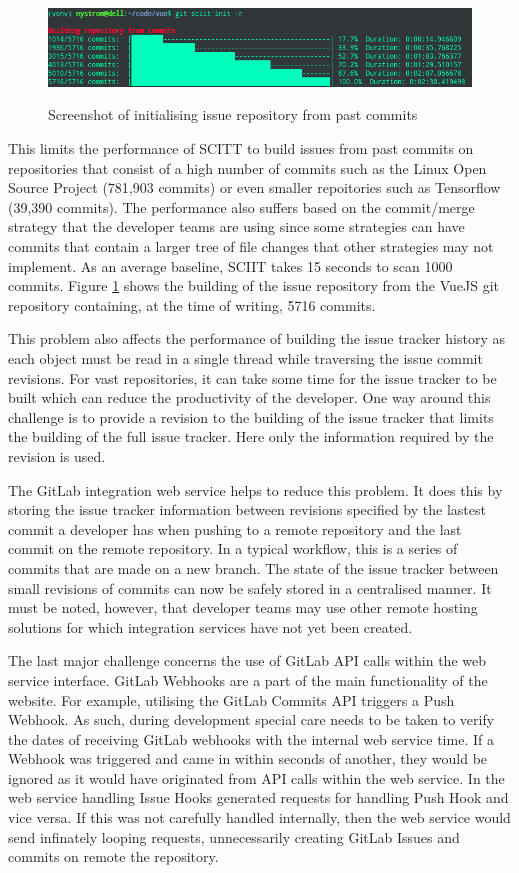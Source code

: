 \documentclass{mproj}
\begin{document}
\begin{figure}[t]
\centering
  \caption{Screenshot of initialising issue repository from past commits}
  \includegraphics[width=14cm]{sciit-init}
  \label{fig:sciit-init}
\end{figure}

This limits the performance of SCITT to build issues from past commits on repositories that consist of a high number of commits such as the Linux Open Source Project (781,903 commits) or even smaller repoitories such as Tensorflow (39,390 commits). The performance also suffers based on the commit/merge strategy that the developer teams are using since some strategies can have commits that contain a larger tree of file changes that other strategies may not implement. As an average baseline, SCIIT takes 15 seconds to scan 1000 commits. Figure \ref{fig:sciit-init} shows the building of the issue repository from the VueJS git repository containing, at the time of writing, 5716 commits.

This problem also affects the performance of building the issue tracker history as each object must be read in a single thread while traversing the issue commit revisions. For vast repositories, it can take some time for the issue tracker to be built which can reduce the productivity of the developer. One way around this challenge is to provide a revision to the building of the issue tracker that limits the building of the full issue tracker. Here only the information required by the revision is used.

The GitLab integration web service helps to reduce this problem. It does this by storing the issue tracker information between revisions specified by the lastest commit a developer has when pushing to a remote repository and the last commit on the remote repository. In a typical workflow, this is a series of commits that are made on a new branch. The state of the issue tracker between small revisions of commits can now be safely stored in a centralised manner. It must be noted, however, that developer teams may use other remote hosting solutions for which integration services have not yet been created.

The last major challenge concerns the use of GitLab API calls within the web service interface. GitLab Webhooks are a part of the main functionality of the website. For example, utilising the GitLab Commits API triggers a Push Webhook. As such, during development special care needs to be taken to verify the dates of receiving GitLab webhooks with the internal web service time. If a Webhook was triggered and came in within seconds of another, they would be ignored as it would have originated from API calls within the web service. In the web service handling Issue Hooks generated requests for handling Push Hook and vice versa. If this was not carefully handled internally, then the web service would send infinately looping requests, unnecessarily creating GitLab Issues and commits on remote the repository.
\end{document}

